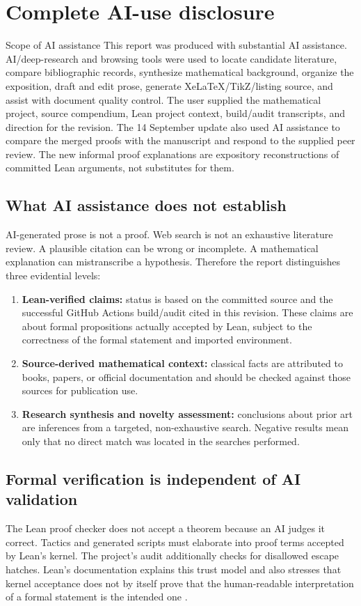 \documentclass[11pt,a4paper,oneside,open=any,headings=small]{scrbook}
\theoremstyle{definition}
\begin{document}
\chapter{Complete AI-use disclosure}\label{app:ai}
\begin{warningbox}{Scope of AI assistance}
This report was produced with substantial AI assistance. AI/deep-research and browsing tools were used to locate candidate literature, compare bibliographic records, synthesize mathematical background, organize the exposition, draft and edit prose, generate XeLaTeX/TikZ/listing source, and assist with document quality control. The user supplied the mathematical project, source compendium, Lean project context, build/audit transcripts, and direction for the revision. The 14 September update also used AI assistance to compare the merged proofs with the manuscript and respond to the supplied peer review. The new informal proof explanations are expository reconstructions of committed Lean arguments, not substitutes for them.
\end{warningbox}

\section*{What AI assistance does not establish}
AI-generated prose is not a proof. Web search is not an exhaustive literature review. A plausible citation can be wrong or incomplete. A mathematical explanation can mistranscribe a hypothesis. Therefore the report distinguishes three evidential levels:
\begin{enumerate}
\item \textbf{Lean-verified claims:} status is based on the committed source and the successful GitHub Actions build/audit cited in this revision. These claims are about formal propositions actually accepted by Lean, subject to the correctness of the formal statement and imported environment.
\item \textbf{Source-derived mathematical context:} classical facts are attributed to books, papers, or official documentation and should be checked against those sources for publication use.
\item \textbf{Research synthesis and novelty assessment:} conclusions about prior art are inferences from a targeted, non-exhaustive search. Negative results mean only that no direct match was located in the searches performed.
\end{enumerate}

\section*{Formal verification is independent of AI validation}
The Lean proof checker does not accept a theorem because an AI judges it correct. Tactics and generated scripts must elaborate into proof terms accepted by Lean's kernel. The project's audit additionally checks for disallowed escape hatches. Lean's documentation explains this trust model and also stresses that kernel acceptance does not by itself prove that the human-readable interpretation of a formal statement is the intended one \parencite{LeanFAQ,LeanValidate}.
\end{document}
